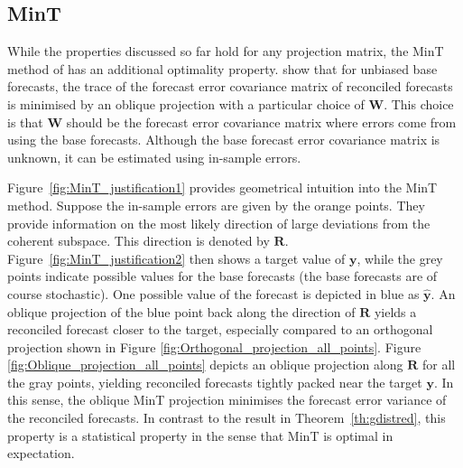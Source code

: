 \documentclass[12pt]{article}
\theoremstyle{definition}
\theoremstyle{property}
\begin{document}
	\subsection{MinT}
	
	While the properties discussed so far hold for any projection matrix, the MinT method of \cite{WicEtAl2019} has an additional optimality property.  \cite{WicEtAl2019} show that for unbiased base forecasts, the trace of the forecast error covariance matrix of reconciled forecasts is minimised by an oblique projection with a particular choice of $\bm{W}$.  This choice is that $\bm{W}$ should be the forecast error covariance matrix where errors come from using the base forecasts.  Although the base forecast error covariance matrix is unknown, it can be estimated using in-sample errors.
	
	
	Figure~\ref{fig:MinT_justification1} provides geometrical intuition into the MinT method.  Suppose the in-sample errors are given by the orange points.  They provide information on the most likely direction of large deviations from the coherent subspace.  This direction is denoted by $\bm{R}$.  Figure~\ref{fig:MinT_justification2} then shows a target value of $\bm{y}$, while the grey points indicate possible values for the base forecasts (the base forecasts are of course stochastic).  One possible value of the forecast is depicted in blue as $\hat{\bm{y}}$.  An oblique projection of the blue point back along the direction of $\bm{R}$ yields a reconciled forecast closer to the target, especially compared to an orthogonal projection shown in Figure \ref{fig:Orthogonal_projection_all_points}.  Figure \ref{fig:Oblique_projection_all_points} depicts an oblique projection along $\bm{R}$ for all the gray points, yielding reconciled forecasts tightly packed near the target $\bm{y}$.  In this sense, the oblique MinT projection minimises the forecast error variance of the reconciled forecasts. In contrast to the result in Theorem~\ref{th:gdistred}, this property is a statistical property in the sense that MinT is optimal in expectation.
	
\end{document}
